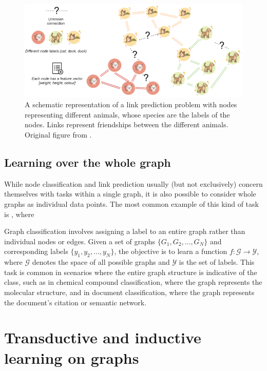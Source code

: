 \begin{figure}
	\includegraphics[width=\linewidth]{images/graph-tasks/link-prediction.png}
	\caption{A schematic representation of a link prediction problem with nodes representing different animals, whose species are the labels of the nodes. Links represent friendships between the different animals. Original figure from \cite{kubara_machine_2020}.}
	\label{fig:link-prediction}
\end{figure}

\subsection{Learning over the whole graph}

While node classification and link prediction usually (but not exclusively) concern themselves with tasks within a single graph, it is also possible to consider whole graphs as individual data points. The most common example of this kind of task is , where 

Graph classification involves assigning a label to an entire graph rather than individual nodes or edges. Given a set of graphs \( \{G_1, G_2, \ldots, G_N\} \) and corresponding labels \( \{y_1, y_2, \ldots, y_N\} \), the objective is to learn a function \( f: \mathcal{G} \rightarrow \mathcal{Y} \), where \( \mathcal{G} \) denotes the space of all possible graphs and \( \mathcal{Y} \) is the set of labels. This task is common in scenarios where the entire graph structure is indicative of the class, such as in chemical compound classification, where the graph represents the molecular structure, and in document classification, where the graph represents the document's citation or semantic network.

\section{Transductive and inductive learning on graphs}

